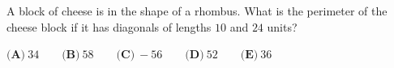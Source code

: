 A block of cheese is in the shape of a rhombus. What is the perimeter of the cheese block if it has diagonals of lengths $10$ and $24$ units?

$\textbf{(A)}~34\qquad\textbf{(B)}~58\qquad\textbf{(C)}~-56\qquad\textbf{(D)}~52\qquad\textbf{(E)}~36\qquad$

